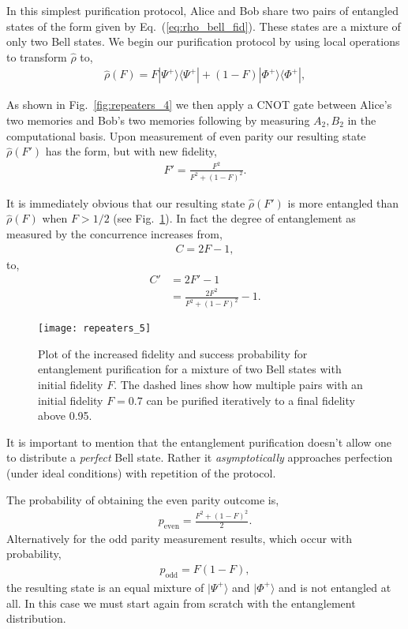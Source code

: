In this simplest purification protocol, Alice and Bob share two pairs of entangled states of the form given by Eq.~(\ref{eq:rho_bell_fid}). These states are a mixture of only two Bell states. We begin our purification protocol by using local operations to transform $\hat\rho$ to,
\begin{align}\label{eq:rho_bell_fid_dash}
\hat\rho(F)=F |\Psi^+\rangle \langle \Psi^+|+(1-F) |\Phi^+\rangle \langle \Phi^+|,
\end{align}

As shown in Fig.~\ref{fig:repeaters_4} we then apply a CNOT gate between Alice's two memories and Bob's two memories following by measuring $A_2, B_2$ in the computational basis. Upon measurement of even parity our resulting state $\hat\rho(F')$ has the form, but with new fidelity,
\begin{align}
	F'=\frac{F^2}{F^2+(1-F)^2}.
\end{align}

It is immediately obvious that our resulting state $\hat\rho(F')$ is more entangled than $\hat\rho(F)$ when \mbox{$F>1/2$} (see Fig.~\ref{fig:rep_purification}). In fact the degree of entanglement as measured by the concurrence increases from,
\begin{align}
	C=2 F-1,
\end{align}
to,
\begin{align}
C' &=2 F'-1 \nonumber\\
&= \frac{2 F^2}{F^2+(1-F)^2}-1.
\end{align}

\begin{figure}[!htb]
\texttt{[image: repeaters\_5]}
\caption{Plot of the increased fidelity and success probability for entanglement purification for a mixture of two Bell states with initial fidelity $F$. The dashed lines show how multiple pairs with an initial fidelity $F=0.7$ can be purified iteratively to a final fidelity above 0.95.} 
\label{fig:rep_purification}
\end{figure} 

It is important to mention that the entanglement purification doesn't allow one to distribute a \textit{perfect} Bell state. Rather it \textit{asymptotically} approaches perfection (under ideal conditions) with repetition of the protocol.

The probability of obtaining the even parity outcome is,
\begin{align}
	p_\mathrm{even}=\frac{F^2+(1-F)^2}{2}.
\end{align}
Alternatively for the odd parity measurement results, which occur with probability,
\begin{align}
	p_\mathrm{odd}=F(1-F),
\end{align}
the resulting state is an equal mixture of $|\Psi^+\rangle$ and $|\Phi^+\rangle$ and is not entangled at all. In this case we must start again from scratch with the entanglement distribution.

